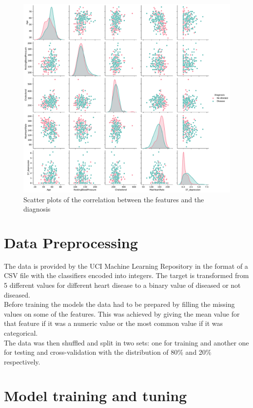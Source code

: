 \documentclass[conference]{IEEEtran}
\begin{document}
\begin{figure}[htpb]
    \centerline{\includegraphics[width=\linewidth]{images/correlation_scatter.pdf}}
    \caption{Scatter plots of the correlation between the features and the diagnosis}
    \label{corr_scatter}
\end{figure}

\section{Data Preprocessing}
The data is provided by the UCI Machine Learning Repository\cite{mlr} in the format of a CSV file with the classifiers encoded into integers. The target is transformed from 5 different values for different heart disease to a binary value of diseased or not diseased.\\
Before training the models the data had to be prepared by filling the missing values on some of the features. This was achieved by giving the mean value for that feature if it was a numeric value or the most common value if it was categorical.\\
The data was then shuffled and split in two sets: one for training and another one for testing and cross-validation with the distribution of 80\% and 20\% respectively.

\section{Model training and tuning}
\end{document}
